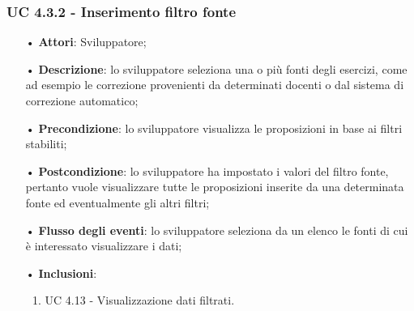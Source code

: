 \subsubsection{UC 4.3.2 - Inserimento filtro fonte}
\begin{itemize}
	\item[•]\textbf{Attori}: Sviluppatore;
	\item[•]\textbf{Descrizione}: lo sviluppatore seleziona una o più fonti degli esercizi, come ad esempio le correzione provenienti da determinati docenti o dal sistema di correzione automatico;
	\item[•]\textbf{Precondizione}: lo sviluppatore visualizza le proposizioni in base ai filtri stabiliti;
	\item[•]\textbf{Postcondizione}: lo sviluppatore ha impostato i valori del filtro fonte, pertanto vuole visualizzare tutte le proposizioni inserite da una determinata fonte ed eventualmente gli altri filtri;
	\item[•]\textbf{Flusso degli eventi}: lo sviluppatore seleziona da un elenco le fonti di cui è interessato visualizzare i dati;
	\item[•]\textbf{Inclusioni}:
	\begin{enumerate}
		\item UC 4.13 - Visualizzazione dati filtrati.
	\end{enumerate}
\end{itemize}

